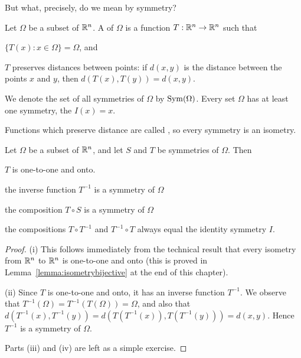 But what, precisely, do we mean by symmetry?

\begin{definition}
  Let $\Omega$ be a subset of $\mathbb{R}^{n}$.  A  of
  $\Omega$ is a function $T: \mathbb{R}^{n} \to \mathbb{R}^{n}$ such that
  \begin{theoremenum}
    \item $\{ T(x) : x \in \Omega \} = \Omega$, and
    \item $T$ preserves distances between points: if $d(x,y)$ is the 
    distance between the points $x$ and $y$, then $d(T(x),T(y)) = 
    d(x,y)$.
  \end{theoremenum}
  We denote the set of all symmetries of $\Omega$ by $\operatorname{Sym}(\Omega)$.  Every
  set $\Omega$ has at least one symmetry, the  $I(x) = x$.

  Functions which preserve distance are called
  , so every symmetry is an isometry.
\end{definition}

\begin{proposition}\label{prop:symmetryfacts}
  Let $\Omega$ be a subset of $\mathbb{R}^{n}$, and let $S$ and $T$ be
  symmetries of $\Omega$.  Then
  \begin{theoremenum}
    \item $T$ is one-to-one and onto.
    
    \item the inverse function $T^{-1}$ is a symmetry of $\Omega$
    
    \item the composition $T \circ S$ is a symmetry of $\Omega$

    \item the compositions $T \circ T^{-1}$ and $T^{-1} \circ T$ always
       equal the identity symmetry $I$.
  \end{theoremenum}
\end{proposition}
\begin{proof}
  (i) This follows immediately from the technical result that every
  isometry from $\mathbb{R}^{n}$ to $\mathbb{R}^{n}$ is one-to-one and onto
  (this is proved in Lemma~\ref{lemma:isometrybijective} at the end of
  this chapter).
  
  (ii) Since $T$ is one-to-one and onto, it has an inverse function
  $T^{-1}$.  We observe that $T^{-1}(\Omega) = T^{-1}(T(\Omega)) =
  \Omega$, and also that $d(T^{-1}(x), T^{-1}(y)) = d(T(T^{-1}(x)),
  T(T^{-1}(y))) = d(x,y)$.  Hence $T^{-1}$ is a symmetry of $\Omega$.

  Parts (iii) and (iv) are left as a simple exercise.
\end{proof}

